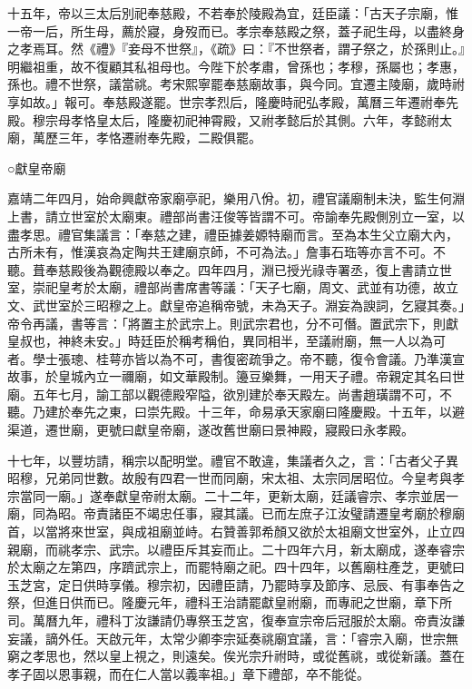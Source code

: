 十五年，帝以三太后別祀奉慈殿，不若奉於陵殿為宜，廷臣議：「古天子宗廟，惟一帝一后，所生母，薦於寢，身歿而已。孝宗奉慈殿之祭，蓋子祀生母，以盡終身之孝焉耳。然《禮》『妾母不世祭』，《疏》曰：『不世祭者，謂子祭之，於孫則止。』明繼祖重，故不復顧其私祖母也。今陛下於孝肅，曾孫也；孝穆，孫屬也；孝惠，孫也。禮不世祭，議當祧。考宋熙寧罷奉慈廟故事，與今同。宜遷主陵廟，歲時祔享如故。」報可。奉慈殿遂罷。世宗孝烈后，隆慶時祀弘孝殿，萬曆三年遷祔奉先殿。穆宗母孝恪皇太后，隆慶初祀神霄殿，又祔孝懿后於其側。六年，孝懿祔太廟，萬歷三年，孝恪遷祔奉先殿，二殿俱罷。

○獻皇帝廟

嘉靖二年四月，始命興獻帝家廟亭祀，樂用八佾。初，禮官議廟制未決，監生何淵上書，請立世室於太廟東。禮部尚書汪俊等皆謂不可。帝諭奉先殿側別立一室，以盡孝思。禮官集議言：「奉慈之建，禮臣據姜嫄特廟而言。至為本生父立廟大內，古所未有，惟漢哀為定陶共王建廟京師，不可為法。」詹事石珤等亦言不可。不聽。葺奉慈殿後為觀德殿以奉之。四年四月，淵已授光祿寺署丞，復上書請立世室，崇祀皇考於太廟，禮部尚書席書等議：「天子七廟，周文、武並有功德，故立文、武世室於三昭穆之上。獻皇帝追稱帝號，未為天子。淵妄為諛詞，乞寢其奏。」帝令再議，書等言：「將置主於武宗上。則武宗君也，分不可僭。置武宗下，則獻皇叔也，神終未安。」時廷臣於稱考稱伯，異同相半，至議祔廟，無一人以為可者。學士張璁、桂萼亦皆以為不可，書復密疏爭之。帝不聽，復令會議。乃準漢宣故事，於皇城內立一禰廟，如文華殿制。籩豆樂舞，一用天子禮。帝親定其名曰世廟。五年七月，諭工部以觀德殿窄隘，欲別建於奉天殿左。尚書趙璜謂不可，不聽。乃建於奉先之東，曰崇先殿。十三年，命易承天家廟曰隆慶殿。十五年，以避渠道，遷世廟，更號曰獻皇帝廟，遂改舊世廟曰景神殿，寢殿曰永孝殿。

十七年，以豐坊請，稱宗以配明堂。禮官不敢違，集議者久之，言：「古者父子異昭穆，兄弟同世數。故殷有四君一世而同廟，宋太祖、太宗同居昭位。今皇考與孝宗當同一廟。」遂奉獻皇帝祔太廟。二十二年，更新太廟，廷議睿宗、孝宗並居一廟，同為昭。帝責諸臣不竭忠任事，寢其議。已而左庶子江汝璧請遷皇考廟於穆廟首，以當將來世室，與成祖廟並峙。右贊善郭希顏又欲於太祖廟文世室外，止立四親廟，而祧孝宗、武宗。以禮臣斥其妄而止。二十四年六月，新太廟成，遂奉睿宗於太廟之左第四，序躋武宗上，而罷特廟之祀。四十四年，以舊廟柱產芝，更號曰玉芝宮，定日供時享儀。穆宗初，因禮臣請，乃罷時享及節序、忌辰、有事奉告之祭，但進日供而已。隆慶元年，禮科王治請罷獻皇祔廟，而專祀之世廟，章下所司。萬曆九年，禮科丁汝謙請仍專祭玉芝宮，復奉宣宗帝后冠服於太廟。帝責汝謙妄議，謫外任。天啟元年，太常少卿李宗延奏祧廟宜議，言：「睿宗入廟，世宗無窮之孝思也，然以皇上視之，則遠矣。俟光宗升祔時，或從舊祧，或從新議。蓋在孝子固以恩事親，而在仁人當以義率祖。」章下禮部，卒不能從。

